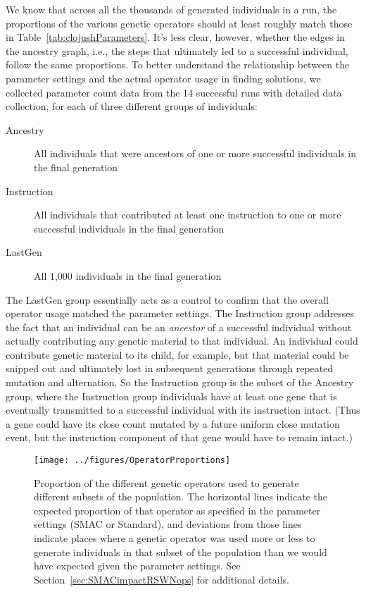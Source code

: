 We know that across all the thousands of generated individuals in a run,
the proportions of the various genetic operators should at least roughly
match those in Table~\ref{tab:clojushParameters}. It's less clear, however,
whether the edges in the ancestry graph, i.e., the steps that ultimately led
to a successful individual, follow the same proportions. To better understand
the relationship between the parameter settings and the actual operator usage
in finding solutions, we collected parameter count data from the 14 successful
runs with detailed data collection, for each of three different 
groups of individuals:
\begin{description}
	\item[Ancestry] All individuals that were ancestors of one or more successful
	individuals in the final generation
	\item[Instruction] All individuals that contributed at least one instruction to
	one or more successful individuals in the final generation
	\item[LastGen] All 1,000 individuals in the final generation
\end{description}
The LastGen group essentially acts as a control to confirm that 
the overall operator usage matched the parameter settings. The Instruction group
addresses the fact that an individual can be an \emph{ancestor} of a
successful individual without actually contributing any genetic material
to that individual. An individual could contribute genetic material to its
child, for example, but that material could be snipped out and 
ultimately lost in subsequent
generations through repeated mutation and alternation. So the Instruction
group is the subset of the Ancestry group, where the Instruction group 
individuals have
at least one gene that is eventually transmitted to a successful individual
with its instruction intact. (Thus a gene could have its close count mutated
by a future uniform close mutation event, but the instruction component of
that gene would have to remain intact.)

\begin{figure*}
	\texttt{[image: ../figures/OperatorProportions]}
	\caption{Proportion of the different genetic operators used to
	generate different subsets of the population. The horizontal lines 
	indicate the expected proportion of that operator as specified in 
	the parameter settings (SMAC or Standard), and deviations from those
	lines indicate places where a genetic operator was used more or less
	to generate individuals in that subset of the population 
	than we would have expected given the parameter settings. See 
	Section~\ref{sec:SMACimpactRSWNops} for additional details.}
	\label{fig:opProportions}
\end{figure*}

